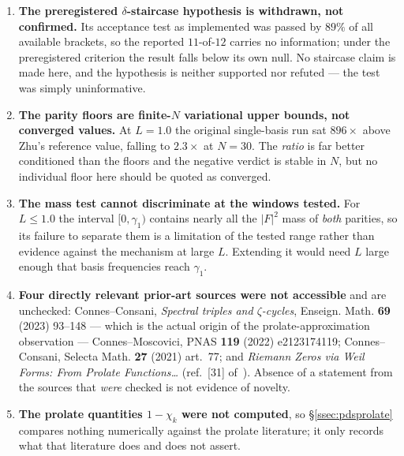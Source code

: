 \begin{enumerate}
at $(L,\delta)=(0.8,10^{-5})$ and $(1.0,10^{-10})$ are \emph{not} excluded --- they are among
the $56$ cells tabulated, and they are what carries the squared-norm means to $527.8\%$ and
$489.8\%$ against medians of $4.06\%$ and $1.94\%$. Medians are the summary to read; a mean
here is not a robust statistic.
\item \textbf{The preregistered $\delta$-staircase hypothesis is withdrawn, not confirmed.}
Its acceptance test as implemented was passed by $89\%$ of all available brackets, so the
reported $11$-of-$12$ carries no information; under the preregistered criterion the result
falls below its own null. No staircase claim is made here, and the hypothesis is neither
supported nor refuted --- the test was simply uninformative.
\item \textbf{The parity floors are finite-$N$ variational upper bounds, not converged
values.} At $L=1.0$ the original single-basis run sat $896\times$ above Zhu's reference
value, falling to $2.3\times$ at $N=30$. The \emph{ratio} is far better conditioned than the
floors and the negative verdict is stable in $N$, but no individual floor here should be
quoted as converged.
\item \textbf{The mass test cannot discriminate at the windows tested.} For $L\le1.0$ the
interval $[0,\gamma_1)$ contains nearly all the $|F|^{2}$ mass of \emph{both} parities, so
its failure to separate them is a limitation of the tested range rather than evidence
against the mechanism at large $L$. Extending it would need $L$ large enough that basis
frequencies reach $\gamma_1$.
\item \textbf{Four directly relevant prior-art sources were not accessible} and are
unchecked: Connes--Consani, \emph{Spectral triples and $\zeta$-cycles}, Enseign. Math.
\textbf{69} (2023) 93--148 --- which is the actual origin of the prolate-approximation
observation --- Connes--Moscovici, PNAS \textbf{119} (2022) e2123174119; Connes--Consani,
Selecta Math. \textbf{27} (2021) art.~77; and \emph{Riemann Zeros via Weil Forms: From
Prolate Functions\dots} (ref.~[31] of~\cite{ConnesLetter}). Absence of a statement from the
sources that \emph{were} checked is not evidence of novelty.
\item \textbf{The prolate quantities $1-\chi_k$ were not computed}, so \S\ref{ssec:pdsprolate}
compares nothing numerically against the prolate literature; it only records what that
literature does and does not assert.
\end{enumerate}
